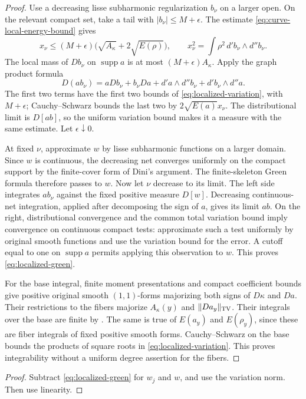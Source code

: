 \documentclass[11pt,reqno]{amsart}
\newtheorem{corollary}[theorem]{Corollary}
\theoremstyle{definition}
\theoremstyle{remark}
\numberwithin{equation}{section}
\newcommand{\supp}{\operatorname{supp}}
\begin{document}
\begin{proof}
Use a decreasing lisse subharmonic regularization \(b_\nu\) on a
larger open. On the relevant compact set, take a tail with
\(|b_\nu|\leq M+\epsilon\). The estimate
\eqref{eq:curve-local-energy-bound} gives
\[
 x_\nu\leq(M+\epsilon)
              \bigl(\sqrt{A_\kappa}+2\sqrt{E(\rho)}\bigr),
 \qquad x_\nu^2=\int\rho^2\,d'b_\nu\wedge d''b_\nu.
\]
The local mass of \(Db_\nu\) on \(\supp a\) is at most
\((M+\epsilon)A_\kappa\). Apply the graph product formula
\[
 D(ab_\nu)=aDb_\nu+b_\nu Da+
              d'a\wedge d''b_\nu+d'b_\nu\wedge d''a.
\]
The first two terms have the first two bounds of
\eqref{eq:localized-variation}, with \(M+\epsilon\); Cauchy--Schwarz
bounds the last two by \(2\sqrt{E(a)}x_\nu\).
The distributional limit is \(D[ab]\), so the uniform variation
bound makes it a measure with the same estimate. Let
\(\epsilon\downarrow0\).

At fixed \(\nu\), approximate \(w\) by lisse subharmonic functions
on a larger domain. Since \(w\) is continuous, the decreasing net
converges uniformly on the compact support by the finite-cover
form of Dini's argument. The finite-skeleton Green formula
therefore passes to \(w\). Now let \(\nu\) decrease to its limit.
The left side integrates \(ab_\nu\) against the fixed positive
measure \(D[w]\). Decreasing continuous-net integration, applied
after decomposing the sign of \(a\), gives its limit \(ab\).
On the right, distributional convergence and the common total
variation bound imply convergence on continuous compact tests:
approximate such a test uniformly by original smooth functions
and use the variation bound for the error. A cutoff equal to one
on $\supp a$ permits applying this observation to $w$.
This proves
\eqref{eq:localized-green}.

For the base integral, finite moment presentations and compact
coefficient bounds give positive original smooth \((1,1)\)-forms
majorizing both signs of \(D\kappa\) and \(Da\). Their restrictions
to the fibers majorize \(A_\kappa(y)\) and \(\|Da_y\|_{\rm TV}\).
Their integrals over the base are finite by
. The same is true of \(E(a_y)\) and
\(E(\rho_y)\), since these are fiber integrals of fixed positive
smooth forms. Cauchy--Schwarz on the base bounds the products of
square roots in \eqref{eq:localized-variation}. This proves
integrability without a uniform degree assertion for the fibers.
\end{proof}

\begin{proof}
Subtract \eqref{eq:localized-green} for \(w_j\) and \(w\), and
use the variation norm. Then use linearity.
\end{proof}
\end{document}
